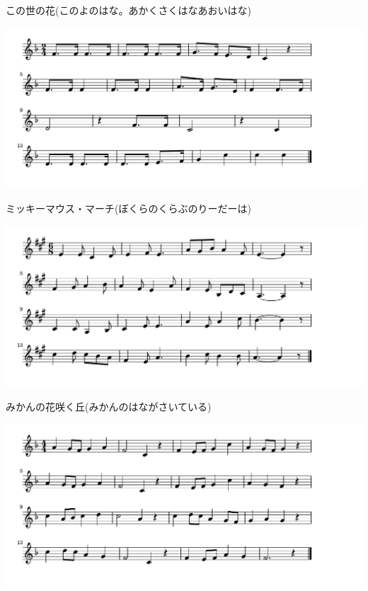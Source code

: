 \documentclass[a4paper]{ltjsarticle}
\begin{document}
\vspace{-10mm} \hspace{10mm}
この世の花(このよのはな。あかくさくはなあおいはな)



\includegraphics[clip]{mickeymousemarch_crop.pdf}

\vspace{-10mm} \hspace{10mm}
ミッキーマウス・マーチ(ぼくらのくらぶのりーだーは)


\includegraphics[clip]{mikan_crop.pdf}

\vspace{-10mm} \hspace{10mm}
みかんの花咲く丘(みかんのはながさいている)



\includegraphics[clip]{momiji_crop.pdf}
\end{document}

